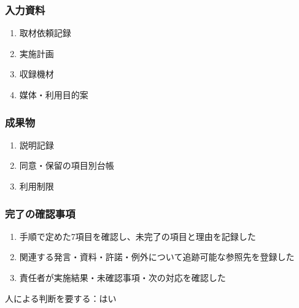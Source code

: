 \documentclass[a4paper,11pt]{article}
\begin{document}
\subsubsection*{入力資料}
\begin{enumerate}[leftmargin=2em,itemsep=0.35em]
\item 取材依頼記録
\item 実施計画
\item 収録機材
\item 媒体・利用目的案
\end{enumerate}
\subsubsection*{成果物}
\begin{enumerate}[leftmargin=2em,itemsep=0.35em]
\item 説明記録
\item 同意・保留の項目別台帳
\item 利用制限
\end{enumerate}
\subsubsection*{完了の確認事項}
\begin{enumerate}[leftmargin=2em,itemsep=0.35em]
\item 手順で定めた7項目を確認し、未完了の項目と理由を記録した
\item 関連する発言・資料・許諾・例外について追跡可能な参照先を登録した
\item 責任者が実施結果・未確認事項・次の対応を確認した
\end{enumerate}
\par 人による判断を要する：はい\par\medskip
\end{document}

